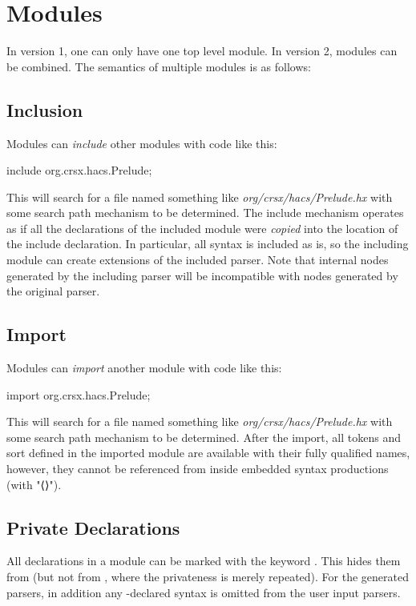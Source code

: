 \documentclass[11pt]{article} %
\begin{document}
\section{Modules}\label{sec:modules}

In version 1, one can only have one top level module. In version 2, modules can be combined.  The
semantics of multiple modules is as follows:

\subsection{Inclusion}

Modules can \emph{include} other modules with code like this:
\begin{hacs}
    include org.crsx.hacs.Prelude;
\end{hacs}
This will search for a file named something like \emph{org/crsx/hacs/Prelude.hx} with some search
path mechanism to be determined.  The include mechanism operates as if all the declarations of the
included module were \emph{copied} into the location of the include declaration.  In particular,
all syntax is included as is, so the including module can create extensions of the included
parser. Note that internal nodes generated by the including parser will be incompatible with nodes
generated by the original parser.

\subsection{Import}

Modules can \emph{import} another module with code like this:
\begin{hacs}
    import org.crsx.hacs.Prelude;
\end{hacs}
This will search for a file named something like \emph{org/crsx/hacs/Prelude.hx} with some search
path mechanism to be determined.  After the import, all tokens and sort defined in the imported
module are available with their fully qualified names, however, they cannot be referenced from
inside embedded syntax productions (with "⟨⟩").

\subsection{Private Declarations}

All declarations in a module can be marked with the keyword . This hides them from
 (but not from , where the privateness is merely repeated). For the generated
parsers, in addition any -declared syntax is omitted from the user input parsers.
\end{document}

